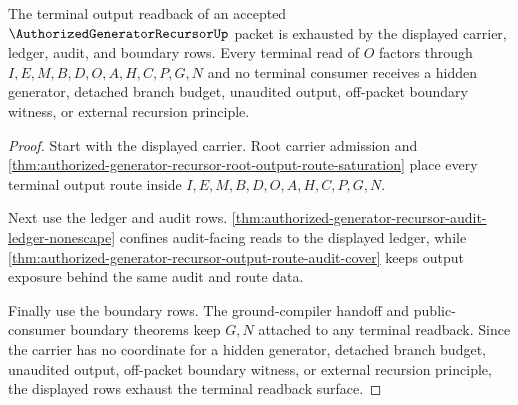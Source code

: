 \begin{theorem}
\label{thm:authorized-generator-recursor-terminal-output-readback-totality}
The terminal output readback of an accepted $\AuthorizedGeneratorRecursorUp$ packet is exhausted by the displayed carrier, ledger, audit, and boundary rows. Every terminal read of $O$ factors through $I,E,M,B,D,O,A,H,C,P,G,N$ and no terminal consumer receives a hidden generator, detached branch budget, unaudited output, off-packet boundary witness, or external recursion principle.
\end{theorem}
\begin{proof}
Start with the displayed carrier. Root carrier admission and \autoref{thm:authorized-generator-recursor-root-output-route-saturation} place every terminal output route inside $I,E,M,B,D,O,A,H,C,P,G,N$.

Next use the ledger and audit rows. \autoref{thm:authorized-generator-recursor-audit-ledger-nonescape} confines audit-facing reads to the displayed ledger, while \autoref{thm:authorized-generator-recursor-output-route-audit-cover} keeps output exposure behind the same audit and route data.

Finally use the boundary rows. The ground-compiler handoff and public-consumer boundary theorems keep $G,N$ attached to any terminal readback. Since the carrier has no coordinate for a hidden generator, detached branch budget, unaudited output, off-packet boundary witness, or external recursion principle, the displayed rows exhaust the terminal readback surface.
\end{proof}

